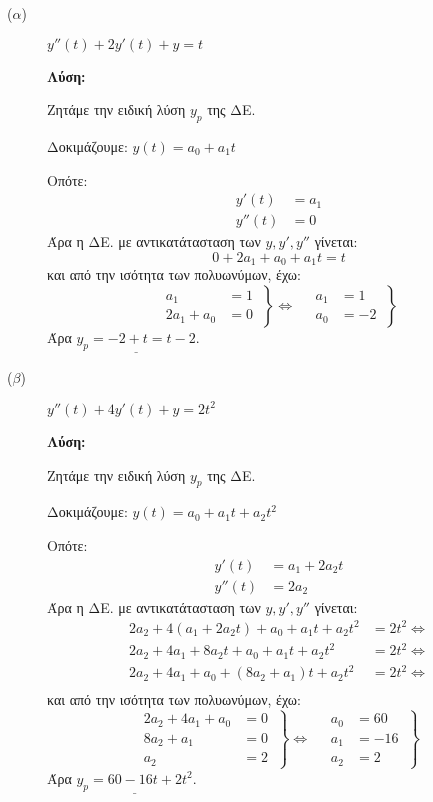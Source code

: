 \documentclass[a4paper,12pt]{article}
\begin{document}
\begin{description}
\item [($\alpha$)] $\boxed{y''(t)+2y'(t) +y=t}$

\textbf{Λύση:}

\vspace{\baselineskip}

Ζητάμε την ειδική λύση $y_p$ της ΔΕ.

Δοκιμάζουμε: $y(t)=a_0+a_1t$

Οπότε:
\begin{align*}
y'(t)&=a_1\\
y''(t)&=0
\end{align*}
Άρα η ΔΕ. με αντικατάτασταση των $y,y',y''$ γίνεται:
\[
0+2a_1+a_0+a_1t=t
\]
και από την ισότητα των πολυωνύμων, έχω:
\[
\left.\begin{aligned}
a_1&=1\\
2a_1+a_0&=0
  \end{aligned}\:\right\}\Leftrightarrow \quad
 \left.\begin{aligned}
a_1&=1\\
a_0&=-2
  \end{aligned}\:\right\}
\]
Άρα $\underline{y_p=-2+t = t-2}$.

\vspace{\baselineskip}

\item [($\beta$)] $\boxed{y''(t)+4y'(t) +y=2t^2}$

\textbf{Λύση:}

\vspace{\baselineskip}

Ζητάμε την ειδική λύση $y_p$ της ΔΕ.

Δοκιμάζουμε: $y(t)=a_0+a_1t+a_2t^2$

Οπότε:
\begin{align*}
y'(t)&=a_1+2a_2t\\
y''(t)&=2a_2
\end{align*}
Άρα η ΔΕ. με αντικατάτασταση των $y,y',y''$ γίνεται:
\begin{align*}
2a_2+4(a_1+2a_2t)+a_0+a_1t+a_2t^2&=2t^2 \Leftrightarrow\\
2a_2+4a_1 + 8a_2t+a_0+a_1t+a_2t^2&=2t^2 \Leftrightarrow\\
2a_2+4a_1+a_0+(8a_2+a_1)t+a_2t^2 &= 2t^2 \Leftrightarrow\\
\end{align*}
και από την ισότητα των πολυωνύμων, έχω:
\[
\left.\begin{aligned}
2a_2+4a_1+a_0&=0 \\
8a_2+a_1 &=0 \\
a_2&=2
  \end{aligned}\:\right\}\Leftrightarrow \quad
 \left.\begin{aligned}
a_0&=60\\
a_1&=-16 \\
a_2&=2
  \end{aligned}\:\right\}
\]
Άρα $\underline{y_p=60-16t+2t^2}$.


\end{description}
\end{document}
